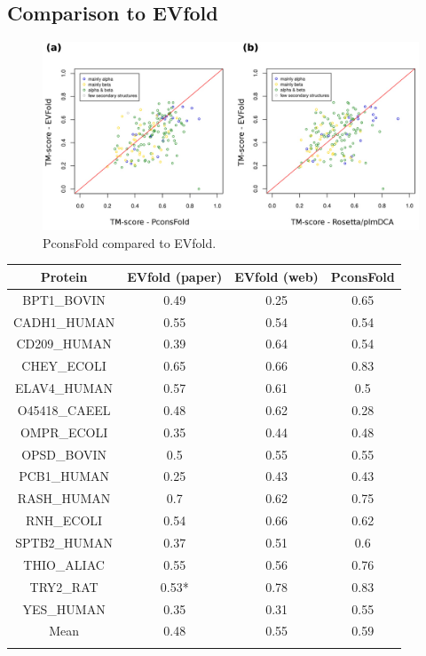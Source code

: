 \documentclass{bioinfo}
\begin{document}
\subsection{Comparison to EVfold}

\begin{figure}[!tpb]%
    \centerline{\includegraphics[scale=0.49]{figures/vs.jpg}}
\caption{PconsFold compared to EVfold.}\label{fig:vs}
\end{figure}

\begin{table}[!t]
{\begin{tabular}{cccc}\toprule
    Protein      & EVfold (paper) & EVfold (web) & PconsFold \\ \midrule
    BPT1\_BOVIN  & 0.49   & 0.25           & 0.65      \\
    CADH1\_HUMAN & 0.55   & 0.54           & 0.54      \\
    CD209\_HUMAN & 0.39   & 0.64           & 0.54      \\
    CHEY\_ECOLI  & 0.65   & 0.66           & 0.83      \\
    ELAV4\_HUMAN & 0.57   & 0.61           & 0.5       \\
    O45418\_CAEEL & 0.48   & 0.62           & 0.28      \\
    OMPR\_ECOLI  & 0.35   & 0.44           & 0.48      \\
    OPSD\_BOVIN  & 0.5    & 0.55           & 0.55      \\
    PCB1\_HUMAN  & 0.25   & 0.43           & 0.43      \\
    RASH\_HUMAN  & 0.7    & 0.62           & 0.75      \\
    RNH\_ECOLI   & 0.54   & 0.66           & 0.62      \\
    SPTB2\_HUMAN & 0.37   & 0.51           & 0.6       \\
    THIO\_ALIAC  & 0.55   & 0.56           & 0.76      \\
    TRY2\_RAT    & 0.53*  & 0.78           & 0.83      \\
    YES\_HUMAN   & 0.35   & 0.31           & 0.55      \\ \midrule
    Mean         & 0.48   & 0.55           & 0.59      \\ \botrule
\end{tabular}}{}
\end{table}
\end{document}
